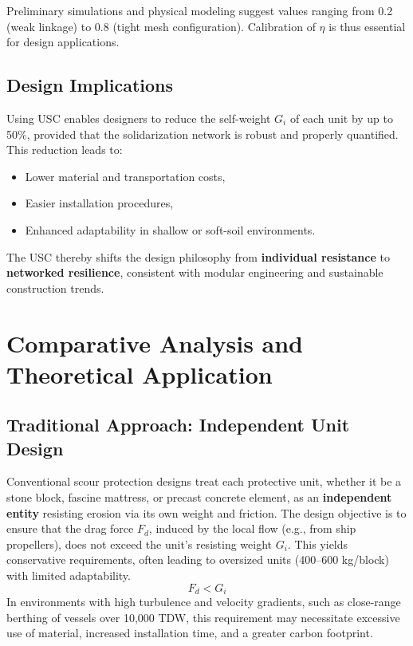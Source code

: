 \documentclass[Journal,letterpaper]{ascelike-new}
\begin{document}
Preliminary simulations and physical modeling suggest values ranging from 0.2 (weak linkage) to 0.8 (tight mesh configuration). Calibration of $\eta $ is thus essential for design applications.

\subsection{Design Implications}

Using USC enables designers to reduce the self-weight $G_i$ of each unit by up to 50\%, provided that the solidarization network is robust and properly quantified. This reduction leads to:

\begin{itemize}
\item  Lower material and transportation costs,

\item  Easier installation procedures,

\item  Enhanced adaptability in shallow or soft-soil environments.
\end{itemize}

The USC thereby shifts the design philosophy from \textbf{individual resistance} to \textbf{networked resilience}, consistent with modular engineering and sustainable construction trends.


\section{Comparative Analysis and Theoretical Application}

\subsection{Traditional Approach: Independent Unit Design}

Conventional scour protection designs treat each protective unit, whether it be a stone block, fascine mattress, or precast concrete element, as an \textbf{independent entity} resisting erosion via its own weight and friction. The design objective is to ensure that the drag force $F_d$, induced by the local flow (e.g., from ship propellers), does not exceed the unit's resisting weight $G_i$. This yields conservative requirements, often leading to oversized units (400--600 kg/block) with limited adaptability.
\[F_d<G_i\]
In environments with high turbulence and velocity gradients, such as close-range berthing of vessels over 10,000 TDW, this requirement may necessitate excessive use of material, increased installation time, and a greater carbon footprint.
\end{document}
